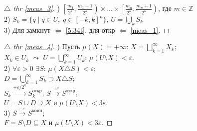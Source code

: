 \begin{minipage}[t]{0.45\textwidth}
\begin{proof}[
{$\triangle$} 
thr \eqref{meas_3}]

\phantom{42}

) $
\left[\frac{m_1}{2^k}, \frac{m_1+1}{2^k} \right) \times
\dots \times 
\left[\frac{m_n}{2^k}, \frac{m_n+1}{2^k} \right)
$, где $m \in \mathbb{Z}$ \\
2) $S_k = \{q \mid q \in U, \; q \in [-k,k]^n\}$, $U =\bigcup_k S_k$ \\
3) Для замкнут $\Leftarrow$ \eqref{5.34t}, для откр $\Leftarrow$ \eqref{meas_1}.
\end{proof}

\begin{proof}[
\hypertarget{meas_4_link}{$\triangle$} 
thr \eqref{meas_4}]

\phantom{42}

) Пусть $\mu(X) = + \infty$: $X = \bigsqcup_{k=1}^{\infty} X_k$; \\
$X_k \in U_k$ $\leadsto$ $U = \bigcup_{k=1}^{\infty}U_k$: $\mu(U \setminus X) < \varepsilon$. \\
2) $\forall \varepsilon > 0$ $\exists S$: $\mu(X \triangle S) < \varepsilon$;\\
$D = \bigcup_{k=1}^{\infty} S_k \supset X \triangle S$; \\
$S_k \overset{+\varepsilon/2^k}{\to} S_k^{\text{откр}} $, 
$S \overset{+\varepsilon}{\to} S^{\text{откр}} $, \\
$U = S \cup D \supseteq X$ и $\mu(U \setminus X) < 3 \varepsilon$. \\
3) $S \overset{-\varepsilon}{\to} S^{\text{комп}}$; \\
$F = S \setminus D \subseteq X$ и $\mu(U \setminus X) < 3 \varepsilon$.
\end{proof}
\end{minipage}  
